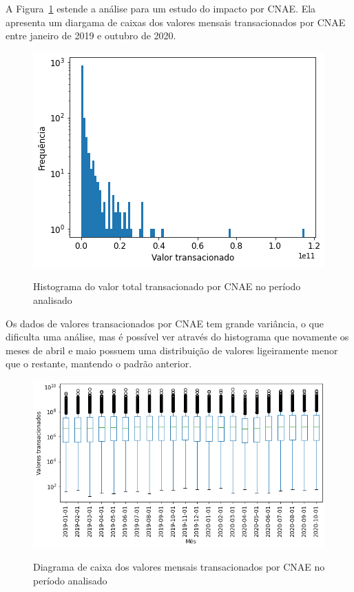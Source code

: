A Figura~\ref{fig:pandemia:base-de-dados-23.1-valor-total-por-cnae} estende a análise para um estudo do impacto por CNAE. Ela apresenta um diargama de caixas dos valores mensais transacionados por CNAE entre janeiro de 2019 e outubro de 2020.

\begin{figure}[htb]
	\centering
    \caption{Histograma do valor total transacionado por CNAE no período analisado}
    \includegraphics[scale=0.7]{images/base-de-dados-23.1-valor-total-por-cnae.png}
    \label{fig:pandemia:base-de-dados-23.1-valor-total-por-cnae}
    \fdadospesquisa
\end{figure}

Os dados de valores transacionados por CNAE tem grande variância, o que dificulta uma análise, mas é possível ver através do histograma que novamente os meses de abril e maio possuem uma distribuição de valores ligeiramente menor que o restante, mantendo o padrão anterior.

\begin{figure}[htb]
	\centering
    \caption{Diagrama de caixa dos valores mensais transacionados por CNAE no período analisado}
    \includegraphics[scale=0.7]{images/base-de-dados-23.2-valor-mensal-por-cnae.png}
    \label{fig:pandemia:base-de-dados-23.2-valor-mensal-por-cnae}
    \fdadospesquisa
\end{figure}

